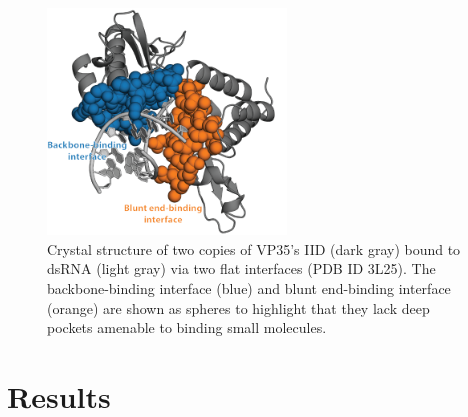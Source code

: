 \documentclass[../main.tex]{subfiles}
\begin{document}
    \begin{figure}[!htb] %
        \centering
        \includegraphics[width=2.5in]{ch5-fig1.png}
        \caption[Crystal structure of two copies of VP35’s IID bound to dsRNA.]
            {Crystal structure of two copies of VP35’s IID (dark gray) bound to dsRNA (light gray) via two flat interfaces (PDB ID 3L25). The backbone-binding interface (blue) and blunt end-binding interface (orange) are shown as spheres to highlight that they lack deep pockets amenable to binding small molecules.}
        \label{fig:ch5-fig1}
    \end{figure}


\section{Results}
\end{document}
